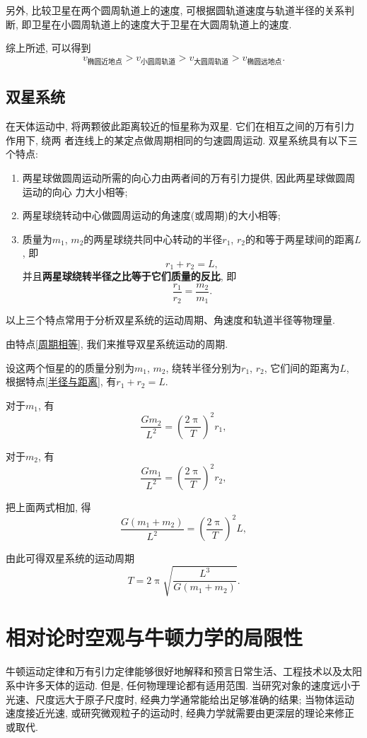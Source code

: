\documentclass[11pt,a4paper]{ctexbook}
\begin{document}
另外, 比较卫星在两个圆周轨道上的速度, 可根据圆轨道速度与轨道半径的关系判断,
即卫星在小圆周轨道上的速度大于卫星在大圆周轨道上的速度.

综上所述, 可以得到
$$v_\text{椭圆近地点} > v_\text{小圆周轨道} > v_\text{大圆周轨道} > v_\text{椭圆远地点}.$$

\subsection{双星系统}

在天体运动中, 将两颗彼此距离较近的恒星称为双星. 它们在相互之间的万有引力作用下, 绕两
者连线上的某定点做周期相同的匀速圆周运动. 双星系统具有以下三个特点:
\begin{enumerate}
	\setlength{\itemsep}{0pt}
	\setlength{\parsep}{0pt}
	\setlength{\parskip}{0pt}
	\item 两星球做圆周运动所需的向心力由两者间的万有引力提供, 因此两星球做圆周运动的向心
	      力大小相等;
	\item 两星球绕转动中心做圆周运动的角速度(或周期)的大小相等;\label{周期相等}
	\item 质量为$m_1$, $m_2$的两星球绕共同中心转动的半径$r_1$, $r_2$的和等于两星球间的距离$L$,
	      即$$r_1 + r_2 = L,$$ 并且\textbf{两星球绕转半径之比等于它们质量的反比}, 即
	      $$\frac{r_1}{r_2} = \frac{m_2}{m_1}.$$ \label{半径与距离}
\end{enumerate}

以上三个特点常用于分析双星系统的运动周期、角速度和轨道半径等物理量.

由特点\ref{周期相等}, 我们来推导双星系统运动的周期.

设这两个恒星的的质量分别为$m_1$, $m_2$, 绕转半径分别为$r_1$, $r_2$, 它们间的距离为$L$, 根据特点\ref{半径与距离},
有$r_1 + r_2 = L$.

对于$m_1$, 有$$\frac{Gm_2}{L^2} = \left(\frac{2\uppi}{T}\right)^2r_1, $$

对于$m_2$, 有$$\frac{Gm_1}{L^2} = \left(\frac{2\uppi}{T}\right)^2r_2, $$

把上面两式相加, 得$$\frac{G(m_1 + m_2)}{L^2} = \left(\frac{2\uppi}{T}\right)^2L, $$

由此可得双星系统的运动周期$$T = 2\uppi \sqrt{\frac{L^3}{G(m_1 + m_2)}}.$$


\section{相对论时空观与牛顿力学的局限性}

牛顿运动定律和万有引力定律能够很好地解释和预言日常生活、工程技术以及太阳系中许多天体的运动.
但是, 任何物理理论都有适用范围. 当研究对象的速度远小于光速、尺度远大于原子尺度时,
经典力学通常能给出足够准确的结果; 当物体运动速度接近光速, 或研究微观粒子的运动时, 经典力学就需要由更深层的理论来修正或取代.
\end{document}
